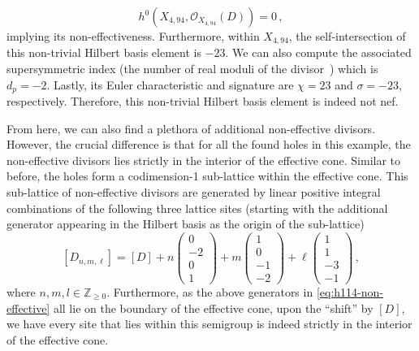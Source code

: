 \documentclass[11pt,dvipsnames]{article}
\theoremstyle{definition}
\begin{document}
\begin{equation}
    h^0(X_{4,94},\mathcal{O}_{X_{4,94}}(D))=0\,,
\end{equation}
implying its non-effectiveness. Furthermore, within $X_{4,94}$, the self-intersection of this non-trivial Hilbert basis element is $-23$. We can also compute the associated supersymmetric index (the number of real moduli of the divisor~\cite{Maldacena:1997de}) which is $d_p=-2$. Lastly, its Euler characteristic and signature are $\chi=23$ and $\sigma=-23$, respectively. Therefore, this non-trivial Hilbert basis element is indeed not nef.

From here, we can also find a plethora of additional non-effective divisors. However, the crucial difference is that for all the found holes in this example, the non-effective divisors lies strictly in the interior of the effective cone. Similar to before, the holes form a codimension-1 sub-lattice within the effective cone. This sub-lattice of non-effective divisors are generated by linear positive integral combinations of the following three lattice sites (starting with the additional generator appearing in the Hilbert basis as the origin of the sub-lattice)
\begin{equation}
\label{eq:h114-non-effective}
    [D_{n,m,\ell}] = [D] +
    n\begin{pmatrix}
        0\\
        -2\\
        0\\
        1
    \end{pmatrix}
    +m\begin{pmatrix}
        1\\
        0\\
        -1\\
        -2
    \end{pmatrix}
    +\ell\begin{pmatrix}
        1\\
        1\\
        -3\\
        -1
    \end{pmatrix}\,,
\end{equation}
where $n,m,l\in\mathbb{Z}_{\geq 0}$. Furthermore, as the above generators in \eqref{eq:h114-non-effective} all lie on the boundary of the effective cone, upon the ``shift'' by $[D]$, we have every site that lies within this semigroup is indeed strictly in the interior of the effective cone.
\end{document}
